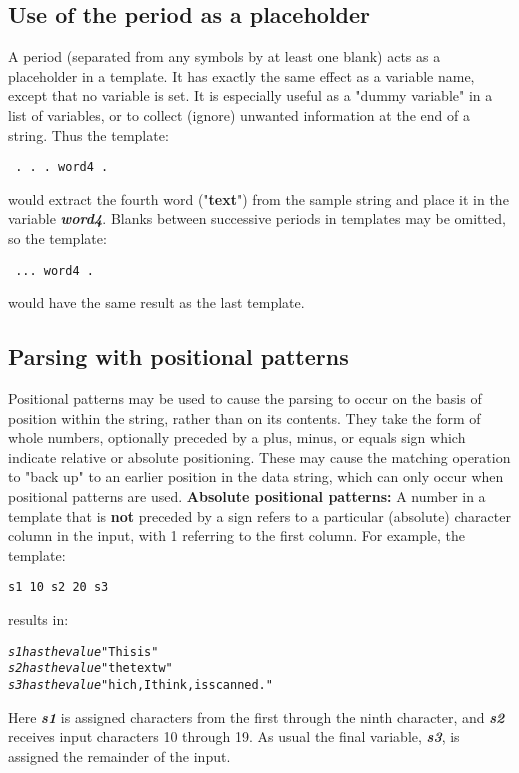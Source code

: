 \subsection{Use of the period as a placeholder}\label{refplaceh}
 A period (separated from any symbols by at least one blank) acts as a
placeholder in a template.
It has exactly the same effect as a variable name, except that no
variable is set.
It is especially useful as a "dummy variable" in a list of
variables, or to collect (ignore) unwanted information at the end of a
string.  Thus the template:
\begin{lstlisting}
 . . . word4 .
\end{lstlisting}
would extract the fourth word ("\textbf{text}") from the sample
string and place it in the variable \textbf{\emph{word4}}.
Blanks between successive periods in templates may be omitted, so the
template:
\begin{lstlisting}
 ... word4 .
\end{lstlisting}
would have the same result as the last template.
\subsection{Parsing with positional patterns}
 Positional patterns may be used to cause the parsing to occur on the
basis of position within the string, rather than on its contents.
They take the form of whole numbers, optionally preceded by a plus,
minus, or equals sign which indicate relative or absolute positioning.
These may cause the matching operation to "back up" to an earlier
position in the data string, which can only occur when positional
patterns are used.
 \textbf{Absolute positional patterns:}
A number in a template that is \textbf{not} preceded by a sign
refers to a particular (absolute)
character column in the input, with 1 referring to the first
column.
For example, the template:
\begin{lstlisting}
s1 10 s2 20 s3
\end{lstlisting}
results in:
\begin{alltt}
\emph{s1} \emph{has the value} "This is  "
\emph{s2} \emph{has the value} "the text w"
\emph{s3} \emph{has the value} "hich, I think,  is scanned."
\end{alltt}
 Here \textbf{\emph{s1}} is assigned characters from the first
through the ninth character, and \textbf{\emph{s2}} receives input
characters 10 through 19.
As usual the final variable, \textbf{\emph{s3}}, is assigned the
remainder of the input.
 
